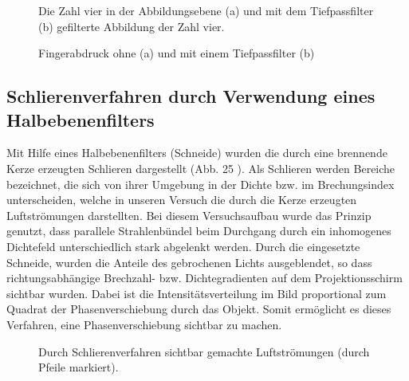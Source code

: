 \begin{figure}[h]
	\centering
	\caption[Zahl 4 mit Tiefpassfilter]{ Die Zahl vier in der Abbildungsebene (a) und mit dem Tiefpassfilter (b) gefilterte 
	Abbildung der Zahl vier. }
	\label{fig:vier_mit_tiefpass}
\end{figure}

\begin{figure}[h]
	\centering
	\caption[Abbildung Fingerabdruck mit Tiefpassfilter]{Fingerabdruck ohne (a) und mit einem Tiefpassfilter (b)}
	\label{fig:fingerabdruck_mit_filtern}
\end{figure}

\subsection{Schlierenverfahren durch Verwendung eines Halbebenenfilters}

Mit Hilfe eines Halbebenenfilters (Schneide) wurden die durch   eine brennende Kerze erzeugten Schlieren dargestellt (Abb. 25%
). Als Schlieren werden Bereiche bezeichnet, die sich von ihrer Umgebung  in  der  Dichte  bzw.  im  Brechungsindex  unterscheiden,  welche  in  unseren Versuch die durch  die  Kerze erzeugten Luftströmungen darstellten. Bei diesem Versuchsaufbau  wurde  das  Prinzip  genutzt,  dass  parallele  Strahlenbündel  beim  Durchgang 
durch   ein   inhomogenes Dichtefeld   unterschiedlich   stark   abgelenkt   werden.   Durch   die eingesetzte  Schneide,  wurden  die  Anteile  des  gebrochenen  Lichts  ausgeblendet,  so  dass 
richtungsabhängige  Brechzahl-  bzw.  Dichtegradienten auf  dem  Projektionsschirm  sichtbar wurden. Dabei ist die Intensitätsverteilung im   Bild   proportional   zum   Quadrat   der Phasenverschiebung   durch   das   Objekt.   Somit   ermöglicht es dieses Verfahren, eine Phasenverschiebung sichtbar zu machen. 

\begin{figure}[h]
	\centering
	\caption[Durch Schlierenverfahren sichtbar gemachte Luftströmungen]{
		Durch Schlierenverfahren sichtbar gemachte Luftströmungen (durch Pfeile markiert).
	}
	\label{fig:luftstroemungen}
\end{figure}
